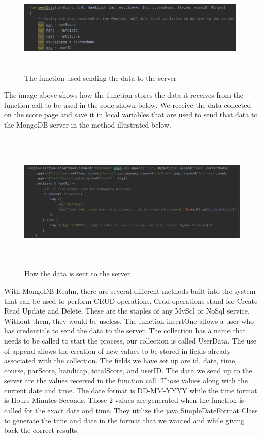 \begin{figure}[H]
    \centering
    \includegraphics[width=11cm, height = 4.5cm]{img/sendDataFunction.PNG}
    \caption{The function used sending the data to the server}
    \label{fig:The function used sending the data to the server}
\end{figure}
The image above shows how the function stores the data it receives from the function call to be used in the code shown below. We receive the data collected on the score page and save it in local variables that are used to send that data to the MongoDB server in the method illustrated below.
\begin{figure}[H]
    \centering
    \includegraphics[width=15cm, height = 6.75cm]{img/sendServer.PNG}
    \caption{How the data is sent to the server}
    \label{fig:How the data is sent to the server}
\end{figure}
With MongoDB Realm, there are several different methods built into the system that can be used to perform CRUD operations. Crud operations stand for Create Read Update and Delete. These are the staples of any MySql or NoSql service. Without them, they would be useless. The function insertOne allows a user who has credentials to send the data to the server.
\newline
\newline
The collection has a name that needs to be called to start the process, our collection is called UserData. The use of append allows the creation of new values to be stored in fields already associated with the collection. The fields we have set up are id, date, time, course, parScore, handicap, totalScore, and userID. The data we send up to the server are the values received in the function call. Those values along with the current date and time.
\newline 
\newline
The date format is DD-MM-YYYY while the time format is Hours-Minutes-Seconds. Those 2 values are generated when the function is called for the exact date and time. They utilize the java SimpleDateFormat Class to generate the time and date in the format that we wanted and while giving back the correct results.
